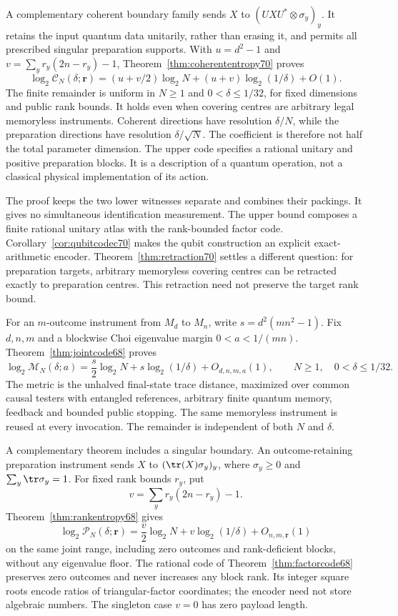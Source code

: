 A complementary coherent boundary family sends
$X$ to $(UXU^*\otimes\sigma_y)_y$. It retains the input quantum data
unitarily, rather than erasing it, and permits all prescribed singular
preparation supports. With $u=d^2-1$ and
$v=\sum_y r_y(2n-r_y)-1$, Theorem~\ref{thm:coherententropy70} proves
\[
 \log_2\mathcal C_N(\delta;\boldsymbol r)
 =(u+v/2)\log_2N+(u+v)\log_2(1/\delta)+O(1).
\]
The finite remainder is uniform in $N\ge1$ and $0<\delta\le1/32$, for
fixed dimensions and public rank bounds. It holds even when covering centres
are arbitrary legal memoryless instruments. Coherent directions have
resolution $\delta/N$, while the preparation directions have resolution
$\delta/\sqrt N$. The coefficient is therefore not half the total
parameter dimension. The upper code specifies a rational unitary and
positive preparation blocks. It is a description of a quantum operation,
not a classical physical implementation of its action.

The proof keeps the two lower witnesses separate and combines their
packings. It gives no simultaneous identification measurement. The upper
bound composes a finite rational unitary atlas with the rank-bounded factor
code. Corollary~\ref{cor:qubitcodec70} makes the qubit construction an
explicit exact-arithmetic encoder. Theorem~\ref{thm:retraction70} settles
a different question: for preparation targets, arbitrary memoryless
covering centres can be retracted exactly to preparation centres. This
retraction need not preserve the target rank bound.

For an $m$-outcome instrument from $M_d$ to $M_n$, write
$s=d^2(mn^2-1)$. Fix $d,n,m$ and a blockwise Choi eigenvalue margin
$0<a<1/(mn)$. Theorem~\ref{thm:jointcode68} proves
\begin{equation*}
 \log_2\mathcal M_N(\delta;a)
 =\frac{s}{2}\log_2 N+s\log_2(1/\delta)+O_{d,n,m,a}(1),
 \qquad N\ge1,\quad 0<\delta\le1/32.
\end{equation*}
The metric is the unhalved final-state trace distance, maximized over
common causal testers with entangled references, arbitrary finite
quantum memory, feedback and bounded public stopping. The same
memoryless instrument is reused at every invocation. The remainder
is independent of both $N$ and $\delta$.

A complementary theorem includes a singular boundary. An
outcome-retaining preparation instrument sends $X$ to
$(\tr(X)\sigma_y)_y$, where $\sigma_y\ge0$ and
$\sum_y\tr\sigma_y=1$. For fixed rank bounds $r_y$, put
\[
                  v=\sum_y r_y(2n-r_y)-1.
\]
Theorem~\ref{thm:rankentropy68} gives
\[
 \log_2\mathcal P_N(\delta;\mathbf r)
 =\frac v2\log_2N+v\log_2(1/\delta)+O_{n,m,\mathbf r}(1)
\]
on the same joint range, including zero outcomes and rank-deficient
blocks, without any eigenvalue floor. The rational code of
Theorem~\ref{thm:factorcode68} preserves zero outcomes and never
increases any block rank. Its integer square roots encode ratios of
triangular-factor coordinates; the encoder need not store algebraic
numbers. The singleton case $v=0$ has zero payload length.

